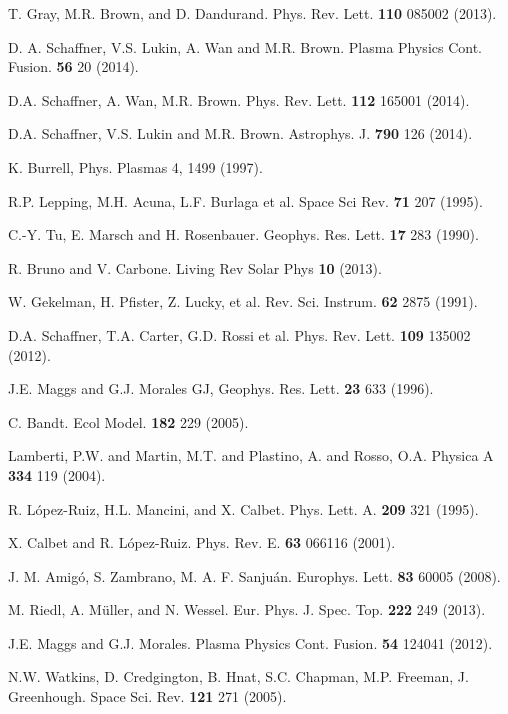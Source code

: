 \documentclass[aps,prx,twocolumn,secnumarabic,nobalancelastpage,amsmath,amssymb,
nofootinbib]{revtex4-1}
\begin{document}
\begin{thebibliography}{99}
T. Gray, M.R. Brown, and D. Dandurand. Phys. Rev. Lett. {\bf 110} 085002 (2013).

D. A. Schaffner, V.S. Lukin, A. Wan and M.R. Brown. Plasma Physics Cont. Fusion. {\bf 56} 20 (2014).

D.A. Schaffner, A. Wan, M.R. Brown. Phys. Rev. Lett. {\bf 112} 165001 (2014).

D.A. Schaffner, V.S. Lukin and M.R. Brown. Astrophys. J. {\bf 790} 126 (2014).

K. Burrell, Phys. Plasmas 4, 1499 (1997).

R.P. Lepping, M.H. Acuna, L.F. Burlaga et al. Space Sci Rev. {\bf 71} 207 (1995).

C.-Y. Tu, E. Marsch and H. Rosenbauer. Geophys. Res. Lett. {\bf 17} 283 (1990).

R. Bruno and V. Carbone. Living Rev Solar Phys {\bf 10} (2013).

W. Gekelman, H. Pfister, Z. Lucky, et al. Rev. Sci. Instrum. {\bf 62} 2875 (1991).

D.A. Schaffner, T.A. Carter, G.D. Rossi et al. Phys. Rev. Lett. {\bf 109} 135002 (2012).

J.E. Maggs and G.J. Morales GJ, Geophys. Res. Lett. {\bf 23} 633 (1996).

C. Bandt. Ecol Model. {\bf 182} 229 (2005).

Lamberti, P.W. and Martin, M.T. and Plastino, A. and Rosso, O.A. Physica A {\bf 334} 119 (2004).

R. L{\'o}pez-Ruiz, H.L. Mancini, and X. Calbet. Phys. Lett. A. {\bf 209} 321 (1995).

X. Calbet and R.  L{\'o}pez-Ruiz. Phys. Rev. E. {\bf 63} 066116 (2001).

J. M. Amig{\'o}, S. Zambrano, M. A. F. Sanju{\'a}n. Europhys. Lett. {\bf 83} 60005 (2008).

M. Riedl, A. M{\"u}ller, and N. Wessel. Eur. Phys. J. Spec. Top. {\bf 222} 249 (2013).

J.E. Maggs and G.J. Morales. Plasma Physics Cont. Fusion. {\bf 54} 124041 (2012).

N.W. Watkins, D. Credgington, B. Hnat, S.C. Chapman, M.P. Freeman, J. Greenhough. Space Sci. Rev. {\bf 121} 271 (2005).


\end{thebibliography}
\end{document}
